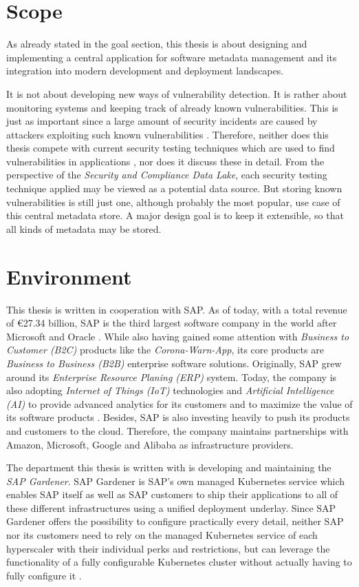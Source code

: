 \section{Scope}
As already stated in the goal section, this thesis is about designing and implementing a central application for software metadata management and its integration into modern development and deployment landscapes.\par
It is not about developing new ways of vulnerability detection. It is rather about monitoring systems and keeping track of already known vulnerabilities. This is just as important since a large amount of security incidents are caused by attackers exploiting such known vulnerabilities \cite{ModelBasedSecurityTesting}. Therefore, neither does this thesis compete with current security testing techniques which are used to find vulnerabilities in applications \cite{SecurityTesting}, nor does it discuss these in detail. From the perspective of the \emph{Security and Compliance Data Lake}, each security testing technique applied may be viewed as a potential data source. But storing known vulnerabilities is still just one, although probably the most popular, use case of this central metadata store. A major design goal is to keep it extensible, so that all kinds of metadata may be stored.  

\section{Environment}
This thesis is written in cooperation with SAP. As of today, with a total revenue of €27.34 billion, SAP is the third largest software company in the world after Microsoft and Oracle \cite{LargestSoftwareCompanies}. While also having gained some attention with \textit{Business to Customer (B2C)} products like the \textit{Corona-Warn-App}, its core products are \textit{Business to Business (B2B)} enterprise software solutions. Originally, SAP grew around its \textit{Enterprise Resource Planing (ERP)} system. Today, the company is also adopting \textit{Internet of Things (IoT)} technologies and \textit{Artificial Intelligence (AI)} to provide advanced analytics for its customers and to maximize the value of its software products \cite{AboutSAP}. Besides, SAP is also investing heavily to push its products and customers to the cloud. Therefore, the company maintains partnerships with Amazon, Microsoft, Google and Alibaba as infrastructure providers.\par 
The department this thesis is written with is developing and maintaining the \textit{SAP Gardener}. SAP Gardener is SAP's own managed Kubernetes service which enables SAP itself as well as SAP customers to ship their applications to all of these different infrastructures using a unified deployment underlay. Since SAP Gardener offers the possibility to configure practically every detail, neither SAP nor its customers need to rely on the managed Kubernetes service of each hyperscaler with their individual perks and restrictions, but can leverage the functionality of a fully configurable Kubernetes cluster without actually having to fully configure it \cite{GardenerValueProposition}. 
   
